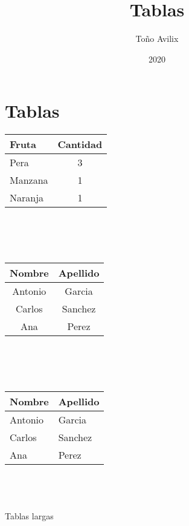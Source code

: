 \documentclass{article}
\title{Tablas}
\author{Toño Avilix }
\date{2020}
\begin{document}
\maketitle

\section{Tablas}

\begin{tabular}{|l|c|}
    \hline
    Fruta & Cantidad \\
    \hline 
    Pera & 3 \\
    Manzana & 1\\
    Naranja & 1 \\
    \hline
\end{tabular}
\\ \\ \\
\begin{tabular}{cc}
    \toprule
    Nombre & Apellido \\
    \midrule
    Antonio & Garcia \\
    Carlos & Sanchez \\
    Ana & Perez \\
    \bottomrule
\end{tabular}
\\  \\ \\
\begin{tabular}{|p{2cm}|p{1.7cm}|}
    \hline
    Nombre & Apellido \\
    \hline
    Antonio & Garcia \\
    Carlos & Sanchez \\
    Ana & Perez \\
    \hline
\end{tabular}
\\ \\ \\
Tablas largas
\end{document}
